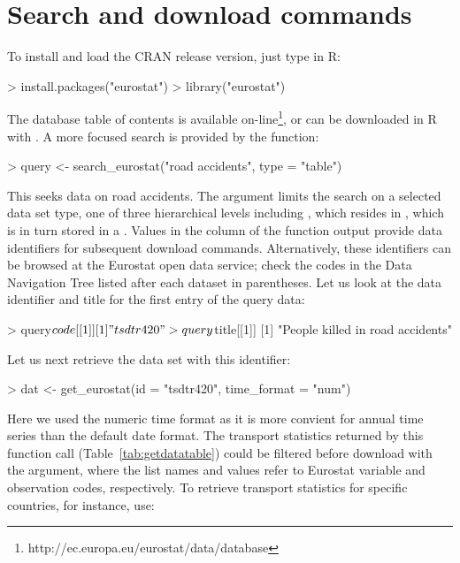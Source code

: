 \section{Search and download commands}

To install and load the CRAN release version, just type in R:

\begin{example}
> install.packages("eurostat")
> library("eurostat")
\end{example}

The database table of contents is available
on-line\footnote{http://ec.europa.eu/eurostat/data/database}, or can
be downloaded in R with . A more focused
search is provided by the  function:

\begin{example}
> query <- search_eurostat("road accidents", type = "table")
\end{example}

This seeks data on road accidents. The  argument limits the
search on a selected data set type, one of three hierarchical levels
including
, which resides in , which is in turn stored in a . Values in the  column of the 
function output provide data identifiers for subsequent download
commands. Alternatively, these identifiers can be browsed at the
Eurostat open data service; check the codes in the Data Navigation
Tree listed after each dataset in parentheses. Let us look at the data
identifier and title for the first entry of the query data:

\begin{example}
> query$code[[1]]
[1] "tsdtr420"

> query$title[[1]]
[1] "People killed in road accidents"
\end{example}


Let us next retrieve the data set with this identifier:

\begin{example}
> dat <- get_eurostat(id = "tsdtr420", time_format = "num")
\end{example}

Here we used the numeric time format as it is more convient for annual
time series than the default date format. The transport statistics
returned by this function call (Table~\ref{tab:getdatatable}) could be
filtered before download with the  argument, where the
list names and values refer to Eurostat variable and observation
codes, respectively. To retrieve transport statistics for specific
countries, for instance, use:

